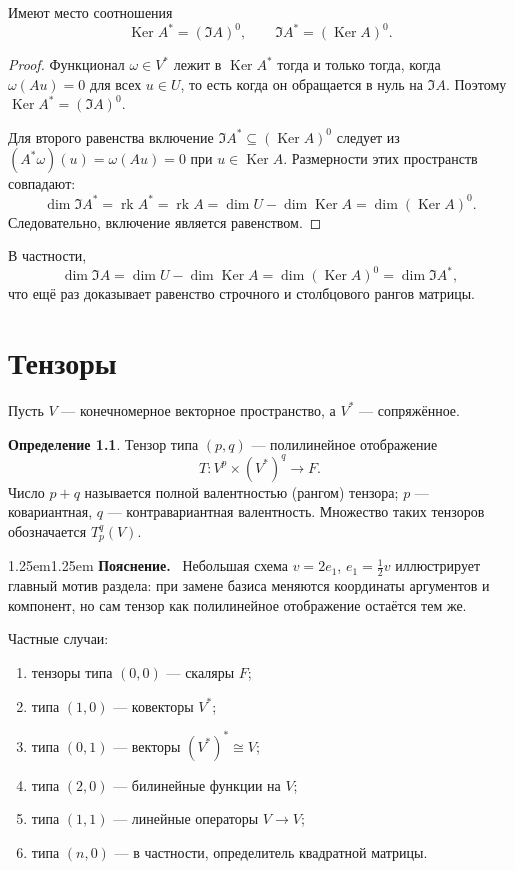 \documentclass[12pt,a4paper,oneside,openany]{book}
\theoremstyle{definition}
\newtheorem{definition}{Определение}[chapter]
\theoremstyle{plain}
\theoremstyle{remark}
\newenvironment{explanation}
  {\begin{adjustwidth}{1.25em}{1.25em}\small
   \noindent\textcolor{logicteal}{\sffamily\bfseries Пояснение.}\ }
  {\par\end{adjustwidth}}
\DeclareMathOperator{\Ker}{Ker}
\DeclareMathOperator{\rk}{rk}
\begin{document}
Имеют место соотношения
\[
  \Ker A^*=(\Im A)^0,
  \qquad
  \Im A^*=(\Ker A)^0.
\]

\begin{proof}
Функционал $\omega\in V^*$ лежит в $\Ker A^*$ тогда и только тогда,
когда $\omega(Au)=0$ для всех $u\in U$, то есть когда он обращается в
нуль на $\Im A$. Поэтому $\Ker A^*=(\Im A)^0$.

Для второго равенства включение
$\Im A^*\subseteq(\Ker A)^0$ следует из
$(A^*\omega)(u)=\omega(Au)=0$ при $u\in\Ker A$. Размерности этих
пространств совпадают:
\[
  \dim\Im A^*=\rk A^*=\rk A
  =\dim U-\dim\Ker A=\dim(\Ker A)^0.
\]
Следовательно, включение является равенством.
\end{proof}
В частности,
\[
  \dim\Im A
  =\dim U-\dim\Ker A
  =\dim(\Ker A)^0
  =\dim\Im A^*,
\]
что ещё раз доказывает равенство строчного и столбцового рангов матрицы.


\chapter{Тензоры}

Пусть $V$ --- конечномерное векторное пространство, а $V^*$ ---
сопряжённое.

\begin{definition}
Тензор типа $(p,q)$ --- полилинейное отображение
\[
  T\colon V^p\times(V^*)^q\to F.
\]
Число $p+q$ называется полной валентностью (рангом) тензора; $p$ ---
ковариантная, $q$ --- контравариантная валентность.
Множество таких тензоров обозначается $T_p^q(V)$.
\end{definition}

\begin{explanation}
Небольшая схема $v=2e_1$, $e_1=\tfrac12v$ иллюстрирует главный мотив
раздела: при замене базиса меняются координаты аргументов и компонент,
но сам тензор как полилинейное отображение остаётся тем же.
\end{explanation}

Частные случаи:
\begin{enumerate}[label=\arabic*)]
  \item тензоры типа $(0,0)$ --- скаляры $F$;
  \item типа $(1,0)$ --- ковекторы $V^*$;
  \item типа $(0,1)$ --- векторы $(V^*)^*\cong V$;
  \item типа $(2,0)$ --- билинейные функции на $V$;
  \item типа $(1,1)$ --- линейные операторы $V\to V$;
  \item типа $(n,0)$ --- в частности, определитель квадратной матрицы.
\end{enumerate}
\end{document}
